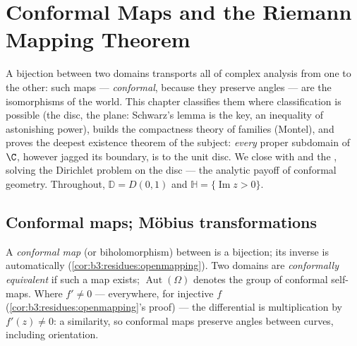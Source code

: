 \chapter{Conformal Maps and the Riemann Mapping Theorem}
\label{ch:b3:conformal}

A  bijection between two domains transports all of
complex analysis from one to the other: such maps ---
\emph{conformal}, because they preserve angles --- are the
isomorphisms of the  world. This chapter classifies
them where classification is possible (the disc, the plane:
Schwarz's lemma is the key, an inequality of astonishing
power), builds the compactness theory of  families
(Montel), and proves the deepest existence theorem of the
subject: \emph{every}  proper subdomain of
$\C$, however jagged its boundary, is 
to the unit disc. We close with  and the
, solving the Dirichlet problem on the disc ---
the analytic payoff of conformal geometry. Throughout,
$\mathbb D = D(0,1)$ and $\mathbb H = \{\operatorname{Im}z >
0\}$.

\section{Conformal maps; M\"obius transformations}

\begin{definition}\label{def:b3:conformal:conformal}
A \emph{conformal map} (or
biholomorphism) between  is a  bijection;
its inverse is automatically 
(\cref{cor:b3:residues:openmapping}). Two domains are
\emph{conformally equivalent} if such a map exists;
$\operatorname{Aut}(\Omega)$ denotes the group of conformal
self-maps. Where $f' \neq 0$ --- everywhere, for injective $f$
(\cref{cor:b3:residues:openmapping}'s proof) --- the
differential is multiplication by $f'(z) \neq 0$: a
similarity, so conformal maps preserve angles between curves,
including orientation.
\end{definition}

